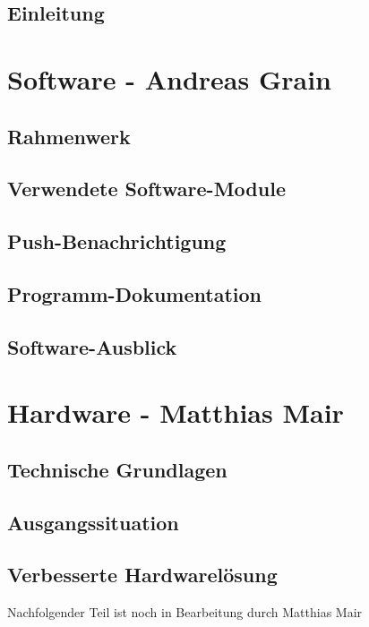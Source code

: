 \documentclass[a4paper, twoside, 12pt, openright
]{memoir}
\newcommand{\AndreasGrain}{Andreas Grain}
\newcommand{\MatthiasMair}{Matthias Mair}
\newcommand{\authorName}{\AndreasGrain\ / \MatthiasMair}
\newcommand{\wip}{{\color{red}Nachfolgender Teil ist noch in Bearbeitung durch \authorName}}
\begin{document}
\mainmatter
\chapter{Einleitung}

\cleartoverso

\renewcommand{\authorName}{\AndreasGrain}
\part{Software - \AndreasGrain}
\chapter{Rahmenwerk}

\chapter{Verwendete Software-Module}

\chapter{Push-Benachrichtigung}
\label{ch:push}

\chapter{Programm-Dokumentation}

\chapter{Software-Ausblick}

\cleartoverso

\renewcommand{\authorName}{\MatthiasMair}
\part{Hardware - \MatthiasMair}
\chapter{Technische Grundlagen}

\chapter{Ausgangssituation}


\chapter{Verbesserte Hardwarelösung}
\wip
\end{document}
